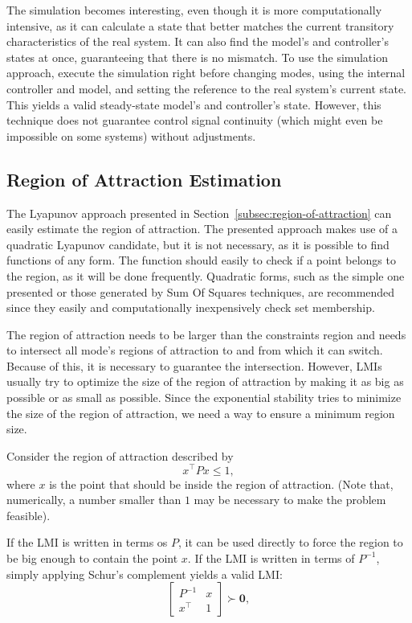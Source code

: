 The simulation becomes interesting, even though it is more computationally
intensive, as it can calculate a state that better matches the current
transitory characteristics of the real system. It can also find the model's and
controller's states at once, guaranteeing that there is no mismatch. To use the
simulation approach, execute the simulation right before changing modes, using
the internal controller and model, and setting the reference to the real
system's current state. This yields a valid steady-state model's and
controller's state. However, this technique does not guarantee control signal
continuity (which might even be impossible on some systems) without adjustments.

\subsection{Region of Attraction Estimation}%
\label{subsec:roa-estimation}

The Lyapunov approach presented in Section~\ref{subsec:region-of-attraction} can
easily estimate the region of attraction. The presented approach makes use of a
quadratic Lyapunov candidate, but it is not necessary, as it is possible to find
functions of any form. The function should easily to check if a point belongs to
the region, as it will be done frequently. Quadratic forms, such as the simple
one presented or those generated by Sum Of Squares techniques, are recommended
since they easily and computationally inexpensively check set membership.

The region of attraction needs to be larger than the constraints region and
needs to intersect all mode's regions of attraction to and from which it can
switch. Because of this, it is necessary to guarantee the intersection. However,
LMIs usually try to optimize the size of the region of attraction by making it
as big as possible or as small as possible. Since the exponential stability
tries to minimize the size of the region of attraction, we need a way to ensure
a minimum region size.

Consider the region of attraction described by
%
\begin{equation}
  x^{\top}Px \le{} 1,
\end{equation}
%
where \(x\) is the point that should be inside the region of attraction. (Note
that, numerically, a number smaller than \(1\) may be necessary to make the
problem feasible).

If the LMI is written in terms os \(P\), it can be used directly to force the
region to be big enough to contain the point \(x\). If the LMI is written in
terms of \(P^{-1}\), simply applying Schur's complement yields a valid LMI:
%
\begin{equation}
  \label{eq:lmi-point-inside-roa}
  \begin{bmatrix}
    P^{-1}   & x \\
    x^{\top} & 1
  \end{bmatrix} \succ \mathbf{0},
\end{equation}

